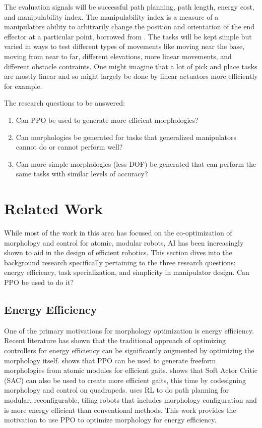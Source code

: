 \documentclass[letterpaper, 10 pt, conference]{ieeeconf}  %
\begin{document}
The evaluation signals will be successful path planning, path length, energy cost, and manipulability index.
The manipulability index is a measure of a manipulators ability to arbitrarily change the position and orientation of the end effector at a particular point, borrowed from \cite{yoshikawa1985manipulability}.
The tasks will be kept simple but varied in ways to test different types of movements like moving near the base, moving from near to far, different elevations, more linear movements, and different obstacle contraints.
One might imagine that a lot of pick and place tasks are mostly linear and so might largely be done by linear actuators more efficiently for example.

The research questions to be answered: 
\begin{enumerate}
    \item Can PPO be used to generate more efficient morphologies?
    \item Can morphologies be generated for tasks that generalized manipulators cannot do or cannot perform well?
    \item Can more simple morphologies (less DOF) be generated that can perform the same tasks with similar levels of accuracy?
\end{enumerate}

\section{Related Work}

While most of the work in this area has focused on the co-optimization of morphology and control for atomic, modular robots, AI has been increasingly shown to aid in the design of efficient robotics.
This section dives into the background research specifically pertaining to the three research questions: energy efficiency, task specialization, and simplicity in manipulator design.
Can PPO be used to do it?

\subsection{Energy Efficiency}
One of the primary motivations for morphology optimization is energy efficiency.
Recent literature has shown that the traditional approach of optimizing controllers for energy efficiency can be significantly augmented by optimizing the morphology itself.
\cite{bhatia2023reinforcement} shows that PPO can be used to generate freeform morphologies from atomic modules for efficient gaits.
\cite{luck2019data} shows that Soft Actor Critic (SAC) can also be used to create more efficient gaits, this time by codesigning morphology and control on quadrapeds.
\cite{le2020reinforcement} uses RL to do path planning for modular, reconfigurable, tiling robots that includes morphology configuration and is more energy efficient than conventional methods.
This work provides the motivation to use PPO to optimize morphology for energy efficiency.
\end{document}
